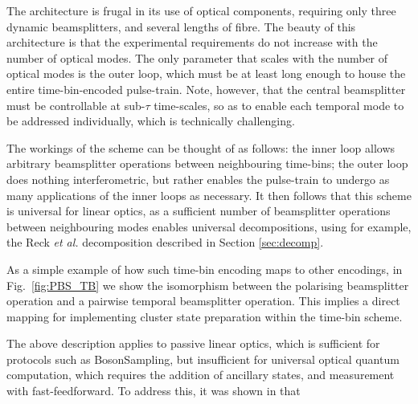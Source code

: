 \documentclass[times,final]{elsarticle}
\newcommand{\sihui}[1]{{\color{red}{#1}}}
\begin{document}
The architecture is frugal in its use of optical components, requiring only three dynamic beamsplitters, and several lengths of fibre. The beauty of this architecture is that the experimental requirements do not increase with the number of optical modes. The only parameter that scales with the number of optical modes is the outer loop, which must be at least long enough to house the entire time-bin-encoded pulse-train. Note, however, that the central beamsplitter must be controllable at sub-$\tau$ time-scales, so as to enable each temporal mode to be addressed individually, which is technically challenging.

The workings of the scheme can be thought of as follows: the inner loop allows arbitrary beamsplitter operations between neighbouring time-bins; the outer loop does nothing interferometric, but rather enables the pulse-train to undergo as many applications of the inner loops as necessary. It then follows that this scheme is universal for linear optics, as a sufficient number of beamsplitter operations between neighbouring modes enables universal decompositions, using for example, the Reck \emph{et al.} decomposition described in Section \ref{sec:decomp}.

As a simple example of how such time-bin encoding maps to other encodings, in Fig.~\ref{fig:PBS_TB} we show the isomorphism between the polarising beamsplitter operation and a pairwise temporal beamsplitter operation. This implies a direct mapping for implementing cluster state preparation within the time-bin scheme.


The above description applies to passive linear optics, which is sufficient for protocols such as {\sc BosonSampling}, but insufficient for universal optical quantum computation, which requires the addition of ancillary states, and measurement with fast-feedforward. To address this, it was shown in \cite{Rohde15} that \sihui{partial measurements can be implemented by coupling in and out arbitrary subsets of the optical modes. The coupling is in turn achieved via dynamically preparing ancillary pulse-trains (using the already existing source) that are classically controlled by time-resolved measurements at the output, and changing the switching sequence conditional on these measurement outcomes.}
\end{document}
